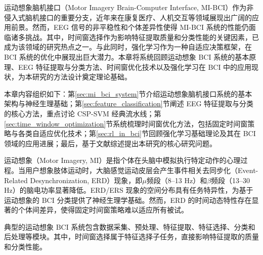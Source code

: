 
\label{chap:related_work}

运动想象脑机接口（Motor Imagery Brain-Computer Interface, MI-BCI）作为非侵入式脑机接口的重要分支，近年来在康复医疗、人机交互等领域展现出广阔的应用前景\cite{pfurtscheller1999event}。然而，EEG 信号的非平稳性和个体差异性使得 MI-BCI 系统的性能仍面临诸多挑战。其中，时间窗选择作为影响特征提取质量和分类性能的关键因素，已成为该领域的研究热点之一\cite{lotte2011regularizing, yang2015time}。与此同时，强化学习作为一种自适应决策框架，在 BCI 系统的优化中展现出巨大潜力\cite{zhang2021mars}。本章将系统回顾运动想象 BCI 系统的基本原理、EEG 特征提取与分类方法、时间窗优化技术以及强化学习在 BCI 中的应用现状，为本研究的方法设计奠定理论基础。

本章内容组织如下：第\ref{sec:mi_bci_system}节介绍运动想象脑机接口系统的基本架构与神经生理基础；第\ref{sec:feature_classification}节阐述 EEG 特征提取与分类的核心方法，重点讨论 CSP-SVM 经典流水线；第\ref{sec:time_window_optimization}节系统梳理时间窗优化方法，包括固定时间窗策略与各类自适应优化技术；第\ref{sec:rl_in_bci}节回顾强化学习基础理论及其在 BCI 领域的应用进展；最后，基于文献综述提出本研究的核心研究问题。

\label{sec:mi_bci_system}

\label{subsec:neuro_basis}

运动想象（Motor Imagery, MI）是指个体在头脑中模拟执行特定动作的心理过程\cite{pfurtscheller1999event}。当用户想象肢体运动时，大脑感觉运动皮层会产生事件相关去同步化（Event-Related Desynchronization, ERD）现象，即$\mu$频段（8--13 Hz）和$\beta$频段（13--30 Hz）的脑电功率显著降低\cite{pfurtscheller1999event}。ERD/ERS 现象的空间分布具有任务特异性，为基于运动想象的 BCI 分类提供了神经生理学基础\cite{mcfarland1997spatial}。然而，ERD 的时间动态特性存在显著的个体间差异，使得固定时间窗策略难以适应所有被试\cite{lotte2011regularizing}。

\label{subsec:bci_architecture}

典型的运动想象 BCI 系统包含数据采集、预处理、特征提取、特征选择、分类和后处理等模块\cite{tangermann2012review}。其中，时间窗选择属于特征选择子任务，直接影响特征提取的质量和分类性能。

